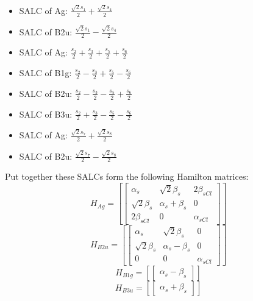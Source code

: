 \documentclass[12pt,a4paper]{article}
\begin{document}
\begin{itemize}
\item SALC of Ag: \quad $\frac{\sqrt{2} s_{1}}{2} + \frac{\sqrt{2} s_{4}}{2}$
\item SALC of B2u: \quad $\frac{\sqrt{2} s_{1}}{2} - \frac{\sqrt{2} s_{4}}{2}$
\item SALC of Ag: \quad $\frac{s_{2}}{2} + \frac{s_{3}}{2} + \frac{s_{5}}{2} + \frac{s_{6}}{2}$
\item SALC of B1g: \quad $\frac{s_{2}}{2} - \frac{s_{3}}{2} + \frac{s_{5}}{2} - \frac{s_{6}}{2}$
\item SALC of B2u: \quad $\frac{s_{2}}{2} - \frac{s_{3}}{2} - \frac{s_{5}}{2} + \frac{s_{6}}{2}$
\item SALC of B3u: \quad $\frac{s_{2}}{2} + \frac{s_{3}}{2} - \frac{s_{5}}{2} - \frac{s_{6}}{2}$
\item SALC of Ag: \quad $\frac{\sqrt{2} s_{7}}{2} + \frac{\sqrt{2} s_{8}}{2}$
\item SALC of B2u: \quad $\frac{\sqrt{2} s_{7}}{2} - \frac{\sqrt{2} s_{8}}{2}$
\end{itemize}
Put together these SALCs form the following Hamilton matrices:
     $$ H_{Ag}= \left[\begin{bmatrix}\alpha_{s} & \sqrt{2} \beta_{s} & 2 \beta_{s Cl}\\\sqrt{2} \beta_{s} & \alpha_{s} + \beta_{s} & 0\\2 \beta_{s Cl} & 0 & \alpha_{s Cl}\end{bmatrix}\right]$$ 
     $$ H_{B2u}= \left[\begin{bmatrix}\alpha_{s} & \sqrt{2} \beta_{s} & 0\\\sqrt{2} \beta_{s} & \alpha_{s} - \beta_{s} & 0\\0 & 0 & \alpha_{s Cl}\end{bmatrix}\right]$$ 
     $$ H_{B1g}= \left[\begin{bmatrix}\alpha_{s} - \beta_{s}\end{bmatrix}\right]$$ 
     $$ H_{B3u}= \left[\begin{bmatrix}\alpha_{s} + \beta_{s}\end{bmatrix}\right]$$ 
\end{document}
